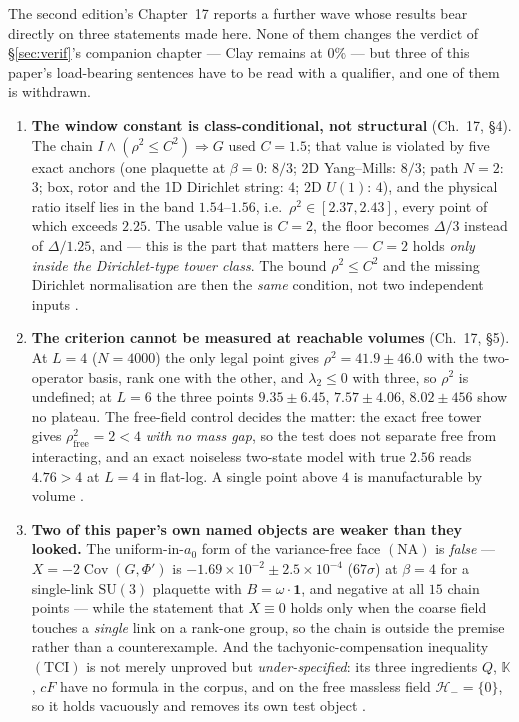 \documentclass[11pt,a4paper]{article}
\newcommand{\labb}[2]{\fcolorbox{#1!35}{#1!8}{\textcolor{#1}{\textbf{\scriptsize #2}}}}
\newcommand{\LC}{\labb{cC}{C}}
\newcommand{\LN}{\labb{cN}{N}}
\newcommand{\LE}{\labb{cE}{E}}
\begin{document}
The second edition's Chapter~17 reports a further wave whose results bear directly on three
statements made here. None of them changes the verdict of \S\ref{sec:verif}'s companion chapter ---
Clay remains at $0\%$ --- but three of this paper's load-bearing sentences have to be read with a
qualifier, and one of them is withdrawn.

\begin{enumerate}
\item \textbf{The window constant is class-conditional, not structural} (Ch.~17, \S4). The chain
  $I\wedge(\rho^2\le C^2)\Rightarrow G$ used $C=1.5$; that value is violated by five exact anchors
  (one plaquette at $\beta=0$: $8/3$; 2D Yang--Mills: $8/3$; path $N=2$: $3$; box, rotor and the 1D
  Dirichlet string: $4$; 2D $U(1)$: $4$), and the physical ratio itself lies in the band
  $1.54$--$1.56$, i.e.\ $\rho^2\in[2.37,2.43]$, every point of which exceeds $2.25$. The usable value
  is $C=2$, the floor becomes $\Delta/3$ instead of $\Delta/1.25$, and --- this is the part that
  matters here --- $C=2$ holds \emph{only inside the Dirichlet-type tower class}. The bound
  $\rho^2\le C^2$ and the missing Dirichlet normalisation are then the \emph{same} condition, not
  two independent inputs \LC.
\item \textbf{The criterion cannot be measured at reachable volumes} (Ch.~17, \S5). At $L=4$
  ($N=4000$) the only legal point gives $\rho^2=41.9\pm46.0$ with the two-operator basis, rank one
  with the other, and $\lambda_2\le0$ with three, so $\rho^2$ is undefined; at $L=6$ the three
  points $9.35\pm6.45$, $7.57\pm4.06$, $8.02\pm456$ show no plateau. The free-field control decides
  the matter: the exact free tower gives $\rho^2_{\mathrm{free}}=2<4$ \emph{with no mass gap}, so the
  test does not separate free from interacting, and an exact noiseless two-state model with true
  $2.56$ reads $4.76>4$ at $L=4$ in flat-log. A single point above $4$ is manufacturable by volume
  \LE.
\item \textbf{Two of this paper's own named objects are weaker than they looked.} The uniform-in-$a_0$
  form of the variance-free face $(\mathrm{NA})$ is \emph{false} --- $X=-2\operatorname{Cov}(G,\Phi')$
  is $-1.69\times10^{-2}\pm2.5\times10^{-4}$ ($67\sigma$) at $\beta=4$ for a single-link $\mathrm{SU}(3)$
  plaquette with $B=\omega\cdot\mathbf 1$, and negative at all $15$ chain points --- while the
  statement that $X\equiv0$ holds only when the coarse field touches a \emph{single} link on a
  rank-one group, so the chain is outside the premise rather than a counterexample. And the
  tachyonic-compensation inequality $(\mathrm{TCI})$ is not merely unproved but
  \emph{under-specified}: its three ingredients $Q$, $\mathbb K$, $cF$ have no formula in the corpus,
  and on the free massless field $\mathcal H_-=\{0\}$, so it holds vacuously and removes its own test
  object \LN.
\end{enumerate}
\end{document}
